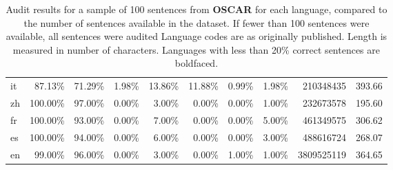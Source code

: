 \begin{table}[hbt!]
{\begin{tabular}{l|rrrr|rrr|rr}
            it           & 87.13\%  & 71.29\%  & 1.98\% & 13.86\% & 11.88\%  & 0.99\%   & 1.98\% & 210348435    & 393.66     \\
            zh           & 100.00\% & 97.00\%  & 0.00\% & 3.00\%  & 0.00\%   & 0.00\%   & 1.00\% & 232673578    & 195.60     \\
            fr           & 100.00\% & 93.00\%  & 0.00\% & 7.00\%  & 0.00\%   & 0.00\%   & 5.00\% & 461349575    & 306.62     \\
            es           & 100.00\% & 94.00\%  & 0.00\% & 6.00\%  & 0.00\%   & 0.00\%   & 3.00\% & 488616724    & 268.07     \\
            en           & 99.00\%  & 96.00\%  & 0.00\% & 3.00\%  & 0.00\%   & 1.00\%   & 1.00\% & 3809525119   & 364.65     \\
            \bottomrule
        \end{tabular}%
    }
    \caption{Audit results for a sample of 100 sentences from \textbf{OSCAR} for each language, compared to the number of sentences available in the dataset. If fewer than 100 sentences were available, all sentences were audited Language codes are as originally published. Length is measured in number of characters. Languages with less than 20\% correct sentences are boldfaced.}
    \label{tab:oscar-full}
\end{table}